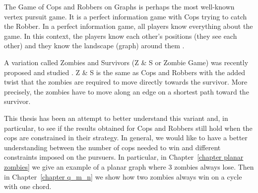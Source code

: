 The Game of Cops and Robbers on Graphs \cite{bonato2011game} is perhaps the most
well-known vertex pursuit game. It is a perfect information game with Cops trying
to catch the Robber. In a perfect information game, all players know everything about the game.
In this context, the players know each other's positions (they see each other) and they
know the landscape (graph) around them \cite{schaefer1978complexity}.

A variation called Zombies and Survivors (Z \& S or Zombie Game) was recently proposed and studied  \cite{fitzpatrick2016deterministic, fitzpatrick2018game}.
Z \& S is the same as Cops and Robbers with the added twist that the zombies are required to move directly towards the survivor. More precisely, the zombies have to move along an edge
on a shortest path toward the survivor.

This thesis has been an attempt to better understand this variant and, in particular,
to see if the results obtained for Cops and Robbers still hold when the cops
are constrained in their strategy. In general, we would like to have a better understanding between the number of cops needed to win and different constraints imposed on the pursuers. In particular, in Chapter~\ref{chapter planar zombies}
we give an example of a planar graph where 3 zombies always lose.
Then in Chapter~\ref{chapter q_m_n} we show how two zombies always win on a cycle with one chord.
